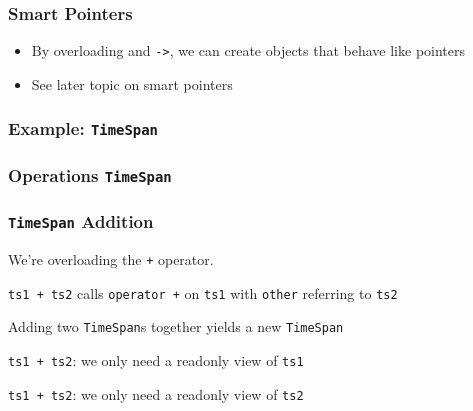 \documentclass{../ucll-slides}
\begin{document}
\begin{frame}
  \frametitle{Smart Pointers}
  \begin{itemize}
    \item By overloading {\tt *} and {\tt ->}, we can
          create objects that behave like pointers
    \item See later topic on smart pointers
  \end{itemize}
\end{frame}

\begin{frame}
  \frametitle{Example: {\tt TimeSpan}}
\end{frame}

\begin{frame}
  \frametitle{Operations {\tt TimeSpan}}
\end{frame}

\begin{frame}
  \frametitle{{\tt TimeSpan} Addition}

  
  \begin{overprint}
    \begin{center}
      We're overloading the {\tt +} operator.
    \end{center}

    \begin{center}
      {\tt ts1 + ts2} calls {\tt operator +} on {\tt ts1} with {\tt other} referring to {\tt ts2}
    \end{center}

    \begin{center}
      Adding two {\tt TimeSpan}s together yields a new {\tt TimeSpan}
    \end{center}

    \begin{center}
      {\tt ts1 + ts2}: we only need a readonly view of {\tt ts1}
    \end{center}

    \begin{center}
      {\tt ts1 + ts2}: we only need a readonly view of {\tt ts2}
    \end{center}
  \end{overprint}
\end{frame}
\end{document}
